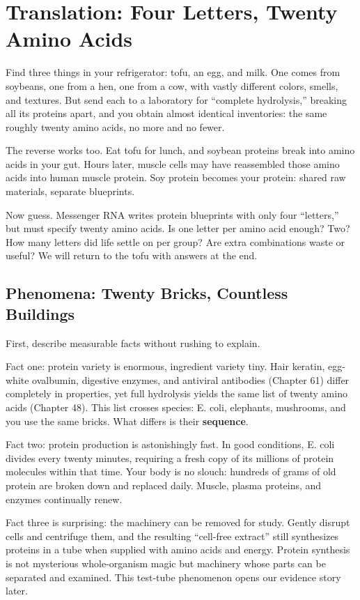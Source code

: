 \chapter{Translation: Four Letters, Twenty Amino Acids}

\begin{kaichang}
Find three things in your refrigerator: tofu, an egg, and milk. One comes from soybeans, one from a hen, one from a cow, with vastly different colors, smells, and textures. But send each to a laboratory for ``complete hydrolysis,'' breaking all its proteins apart, and you obtain almost identical inventories: the same roughly twenty amino acids, no more and no fewer.

The reverse works too. Eat tofu for lunch, and soybean proteins break into amino acids in your gut. Hours later, muscle cells may have reassembled those amino acids into human muscle protein. Soy protein becomes your protein: shared raw materials, separate blueprints.

Now guess. Messenger RNA writes protein blueprints with only four ``letters,'' but must specify twenty amino acids. Is one letter per amino acid enough? Two? How many letters did life settle on per group? Are extra combinations waste or useful? We will return to the tofu with answers at the end.
\end{kaichang}

\section{Phenomena: Twenty Bricks, Countless Buildings}

First, describe measurable facts without rushing to explain.

Fact one: protein variety is enormous, ingredient variety tiny. Hair keratin, egg-white ovalbumin, digestive enzymes, and antiviral antibodies (Chapter 61) differ completely in properties, yet full hydrolysis yields the same list of twenty amino acids (Chapter 48). This list crosses species: E. coli, elephants, mushrooms, and you use the same bricks. What differs is their \textbf{sequence}.

Fact two: protein production is astonishingly fast. In good conditions, E. coli divides every twenty minutes, requiring a fresh copy of its millions of protein molecules within that time. Your body is no slouch: hundreds of grams of old protein are broken down and replaced daily. Muscle, plasma proteins, and enzymes continually renew.

Fact three is surprising: the machinery can be removed for study. Gently disrupt cells and centrifuge them, and the resulting ``cell-free extract'' still synthesizes proteins in a tube when supplied with amino acids and energy. Protein synthesis is not mysterious whole-organism magic but machinery whose parts can be separated and examined. This test-tube phenomenon opens our evidence story later.

